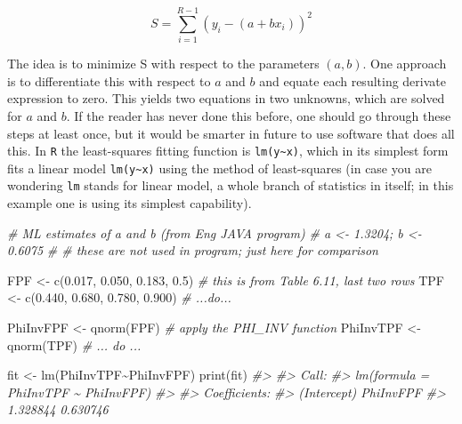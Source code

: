 \documentclass[
]{book}
\newenvironment{Shaded}{\begin{snugshade}}{\end{snugshade}}
\newcommand{\CommentTok}[1]{\textcolor[rgb]{0.56,0.35,0.01}{\textit{#1}}}
\newcommand{\FloatTok}[1]{\textcolor[rgb]{0.00,0.00,0.81}{#1}}
\newcommand{\FunctionTok}[1]{\textcolor[rgb]{0.00,0.00,0.00}{#1}}
\newcommand{\NormalTok}[1]{#1}
\newcommand{\OtherTok}[1]{\textcolor[rgb]{0.56,0.35,0.01}{#1}}
\newcommand{\SpecialCharTok}[1]{\textcolor[rgb]{0.00,0.00,0.00}{#1}}
\begin{document}
\begin{equation*} 
S  = \sum_{i=1}^{R-1}\left ( y_i - \left ( a + bx_i \right ) \right )^2
\end{equation*}

The idea is to minimize S with respect to the parameters \((a,b)\). One approach is to differentiate this with respect to \(a\) and \(b\) and equate each resulting derivate expression to zero. This yields two equations in two unknowns, which are solved for \(a\) and \(b\). If the reader has never done this before, one should go through these steps at least once, but it would be smarter in future to use software that does all this. In \texttt{R} the least-squares fitting function is \texttt{lm(y\textasciitilde{}x)}, which in its simplest form fits a linear model \texttt{lm(y\textasciitilde{}x)} using the method of least-squares (in case you are wondering \texttt{lm} stands for linear model, a whole branch of statistics in itself; in this example one is using its simplest capability).

\begin{Shaded}
\begin{Highlighting}[]
\CommentTok{\# ML estimates of a and b (from Eng JAVA program)}
\CommentTok{\# a \textless{}{-} 1.3204; b \textless{}{-} 0.6075 }
\CommentTok{\# \# these are not used in program; just here for comparison}

\NormalTok{FPF }\OtherTok{\textless{}{-}} \FunctionTok{c}\NormalTok{(}\FloatTok{0.017}\NormalTok{, }\FloatTok{0.050}\NormalTok{, }\FloatTok{0.183}\NormalTok{, }\FloatTok{0.5}\NormalTok{)  }
\CommentTok{\# this is from Table 6.11, last two rows}
\NormalTok{TPF }\OtherTok{\textless{}{-}} \FunctionTok{c}\NormalTok{(}\FloatTok{0.440}\NormalTok{, }\FloatTok{0.680}\NormalTok{, }\FloatTok{0.780}\NormalTok{, }\FloatTok{0.900}\NormalTok{)}
\CommentTok{\# ...do...}

\NormalTok{PhiInvFPF }\OtherTok{\textless{}{-}} \FunctionTok{qnorm}\NormalTok{(FPF)}
\CommentTok{\# apply the PHI\_INV function}
\NormalTok{PhiInvTPF }\OtherTok{\textless{}{-}} \FunctionTok{qnorm}\NormalTok{(TPF)}
\CommentTok{\# ... do ... }

\NormalTok{fit }\OtherTok{\textless{}{-}} \FunctionTok{lm}\NormalTok{(PhiInvTPF}\SpecialCharTok{\textasciitilde{}}\NormalTok{PhiInvFPF)}
\FunctionTok{print}\NormalTok{(fit)}
\CommentTok{\#\textgreater{} }
\CommentTok{\#\textgreater{} Call:}
\CommentTok{\#\textgreater{} lm(formula = PhiInvTPF \textasciitilde{} PhiInvFPF)}
\CommentTok{\#\textgreater{} }
\CommentTok{\#\textgreater{} Coefficients:}
\CommentTok{\#\textgreater{} (Intercept)    PhiInvFPF  }
\CommentTok{\#\textgreater{}    1.328844     0.630746}
\end{Highlighting}
\end{Shaded}
\end{document}
